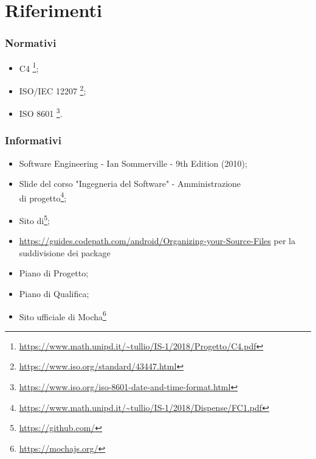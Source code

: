 \section{Riferimenti}
\subsubsection{Normativi}
\begin{itemize}
	\item {} C4
	\footnote{\url{https://www.math.unipd.it/~tullio/IS-1/2018/Progetto/C4.pdf}};
	
	\item ISO/IEC 12207
	\footnote{\url{https://www.iso.org/standard/43447.html}};
	
	\item ISO 8601
	\footnote{\url{https://www.iso.org/iso-8601-date-and-time-format.html}}.
\end{itemize}
\subsubsection{Informativi}
\begin{itemize}
	\item Software Engineering - Ian Sommerville - 9th Edition (2010);
	
	\item Slide del corso "Ingegneria del Software" - Amministrazione\\ di progetto\footnote{\url{https://www.math.unipd.it/~tullio/IS-1/2018/Dispense/FC1.pdf}};
	
	\item Sito di\footnote{\url{https://github.com/}};
	\item \url{https://guides.codepath.com/android/Organizing-your-Source-Files} per la suddivisione dei package \label{package}
	\item Piano di Progetto;
	\item Piano di Qualifica;
	\item Sito ufficiale di Mocha\footnote{\url{https://mochajs.org/}}
	
\end{itemize}
\newpage
